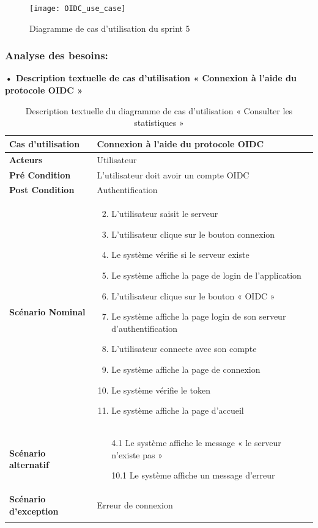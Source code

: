 \begin{figure}[H]
  \centering
  \texttt{[image: OIDC\_use\_case]}
  \caption{Diagramme de cas d'utilisation du sprint 5}
  \label{fig:UseCaseDiagramSp51}
\end{figure}

\subsubsection{Analyse des besoins:}
\textbf{•	Description textuelle de cas d'utilisation « Connexion à l'aide du protocole OIDC  »}

\begin{longtable}{|p{5cm}|p{10cm}|}
\hline
\textbf{Cas d'utilisation}&Connexion à l'aide du protocole OIDC\\
\hline
\textbf{Acteurs}&Utilisateur\\
\hline
\textbf{Pré Condition}&L'utilisateur doit avoir un compte OIDC\\
\hline
\textbf{Post Condition}&Authentification\\
\hline
\textbf{Scénario Nominal}&
\vspace{-\baselineskip}
\begin{enumerate}
  \setcounter{enumi}{1}
    \item L'utilisateur saisit le serveur
    \item L'utilisateur clique sur le bouton connexion
    \item Le système vérifie si le serveur existe
    \item Le système affiche la page de login de l'application
    \item L'utilisateur clique sur le bouton « OIDC »
    \item Le système affiche la page login de son serveur d'authentification
    \item L'utilisateur connecte avec son compte
    \item Le système affiche la page de connexion 
    \item Le système vérifie le token
    \item Le système affiche la page d'accueil 
  
\end{enumerate}\\
\hline
\textbf{Scénario alternatif}&
\vspace{-\baselineskip}
\begin{enumerate}
  \item [4.1] Le système affiche le message « le serveur n'existe pas »
  \item [10.1] Le système affiche un message d'erreur
\end{enumerate}\\
\hline
\textbf{Scénario d'exception}&Erreur de connexion\\
\hline
\caption{Description textuelle du diagramme de cas d'utilisation « Consulter les statistiques »}
\label{tab:use_case_oidc_connect}
\end{longtable}

